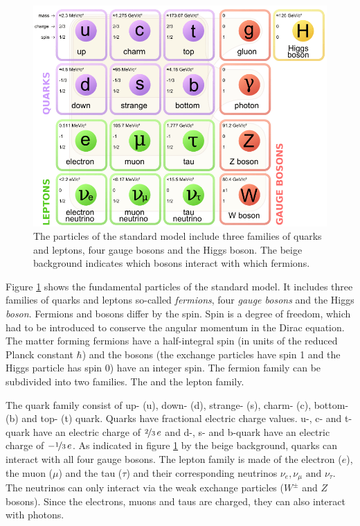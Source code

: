 \documentclass[a4paper,11pt,twosided,final,german,openbib,pdftex,listof=totoc,bibliography=totoc]{scrbook}
\begin{document}
\begin{figure}[h!]
	\centering
	\includegraphics[width=\textwidth]{Bilder/SM.png}
	\caption[Standard Model]{The particles of the standard model include three families of quarks and leptons, four gauge bosons and the Higgs boson. The beige background indicates which bosons interact with which fermions. \cite{SMFigure}}
	\label{fig:SM}
\end{figure}



Figure \ref{fig:SM} shows the fundamental particles of the standard model. It includes three families of quarks and leptons so-called \textit{fermions}, four \textit{gauge bosons} and the Higgs \textit{boson}. Fermions and bosons differ by the spin. Spin is a degree of freedom, which had to be introduced to conserve the angular momentum in the Dirac equation. The matter forming fermions have a half-integral spin (in units of the reduced Planck constant $\hbar$) and the bosons (the exchange particles have spin 1 and the Higgs particle has spin 0) have an integer spin. The fermion family can be subdivided into two families. The  and the lepton family. 

The quark family consist of up- (u), down- (d), strange- (s), charm- (c), bottom- (b) and top- (t) quark. Quarks have fractional electric charge values. u-, c- and t-quark have an electric charge of $\nicefrac{2}{3} \,e$ and d-, s- and b-quark have an electric charge of $-\nicefrac{1}{3} \,e$. As indicated in figure \ref{fig:SM} by the beige background, quarks can interact with all four gauge bosons.
The lepton family is made of the electron ($e$), the muon ($\mu$) and the tau ($\tau$) and their corresponding neutrinos $\nu_e,\nu_{\mu} \textrm{ and } \nu_{\tau}$. The neutrinos can only interact via the weak exchange particles ($W^{\pm}$ and $Z$ bosons). Since the electrons, muons and taus are charged, they can also interact with photons.
\end{document}
